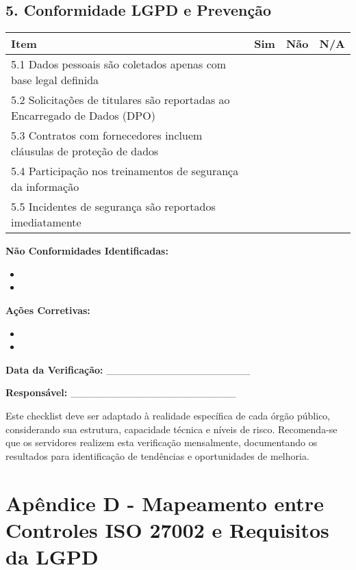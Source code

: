 \documentclass[12pt,a4paper]{report}
\begin{document}
\begin{tcolorbox}[colback=boxcolor,colframe=sectioncolor,arc=2mm,title=\textbf{CHECKLIST MENSAL DE SEGURANÇA DA INFORMAÇÃO}]
\subsection*{5. Conformidade LGPD e Prevenção}
\begin{tabular}{|p{8cm}|p{1cm}|p{1cm}|p{1cm}|}
\hline
\textbf{Item} & \textbf{Sim} & \textbf{Não} & \textbf{N/A} \\
\hline
5.1 Dados pessoais são coletados apenas com base legal definida & & & \\
\hline
5.2 Solicitações de titulares são reportadas ao Encarregado de Dados (DPO) & & & \\
\hline
5.3 Contratos com fornecedores incluem cláusulas de proteção de dados & & & \\
\hline
5.4 Participação nos treinamentos de segurança da informação & & & \\
\hline
5.5 Incidentes de segurança são reportados imediatamente & & & \\
\hline
\end{tabular}

\vspace{0.5cm}

\textbf{Não Conformidades Identificadas:}
\begin{itemize}
  \item 
  \item 
\end{itemize}

\textbf{Ações Corretivas:}
\begin{itemize}
  \item 
  \item 
\end{itemize}

\textbf{Data da Verificação:} \_\_\_\_\_\_\_\_\_\_\_\_\_\_\_\_\_\_\_\_

\textbf{Responsável:} \_\_\_\_\_\_\_\_\_\_\_\_\_\_\_\_\_\_\_\_\_\_\_

\end{tcolorbox}

\begin{infobox}
Este checklist deve ser adaptado à realidade específica de cada órgão público, considerando sua estrutura, capacidade técnica e níveis de risco. Recomenda-se que os servidores realizem esta verificação mensalmente, documentando os resultados para identificação de tendências e oportunidades de melhoria.
\end{infobox}

\section{Apêndice D - Mapeamento entre Controles ISO 27002 e Requisitos da LGPD}
\end{document}
